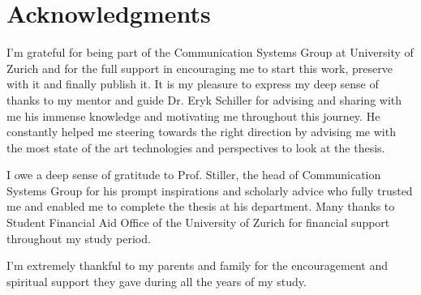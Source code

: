 \chapter*{Acknowledgments}



I'm grateful for being part of the Communication Systems Group at University of Zurich and for the full support in encouraging me to start this work, preserve with it and finally publish it. 
It is my pleasure to express my deep sense of thanks to my mentor and guide Dr. Eryk Schiller for advising and sharing with me his immense knowledge and motivating me throughout this journey. He constantly helped me steering towards the right direction by advising me with the most state of the art technologies and perspectives to look at the thesis.

I owe a deep sense of gratitude to Prof. Stiller, the head of Communication Systems Group for his prompt inspirations and scholarly advice who fully trusted me and enabled me to complete the thesis at his department. 
Many thanks to Student Financial Aid Office of the University of Zurich for financial support throughout my study period. 

I'm extremely thankful to my parents and family for the encouragement and spiritual support they gave during all the years of my study. 





